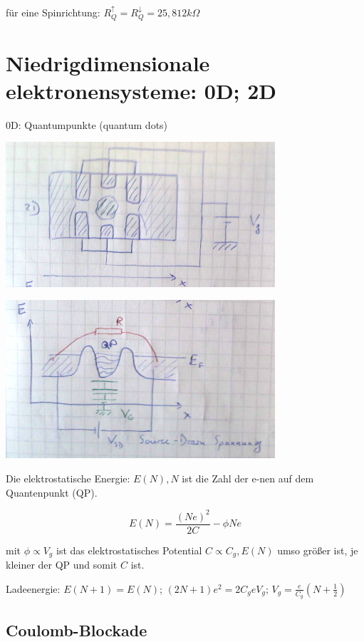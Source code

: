 für eine Spinrichtung: \(R^\uparrow_Q =R^\downarrow_Q =25,812 k\Omega \)

\section{Niedrigdimensionale elektronensysteme: 0D; 2D}


0D: Quantumpunkte (quantum dots)


\includegraphics[width=0.75\textwidth]{kap11_06.png}

\includegraphics[width=0.75\textwidth]{kap11_07.png}

Die elektrostatische Energie: \(E(N),N\) ist die Zahl der e-nen auf dem Quantenpunkt (QP).

\[E(N) = \frac{(Ne)^2}{2C}-\phi Ne\]

mit \(\phi\propto V_g\) ist das elektrostatisches Potential
\(C\propto C_g, E(N)\) umso größer ist, je kleiner der QP und somit \(C\) ist.

Ladeenergie: \(E(N+1) = E(N)\); \((2N+1)e^2 = 2C_g eV_g\); \(V_g = \frac{e}{C_g}(N+\frac{1}{2})\)



\subsection{Coulomb-Blockade}

